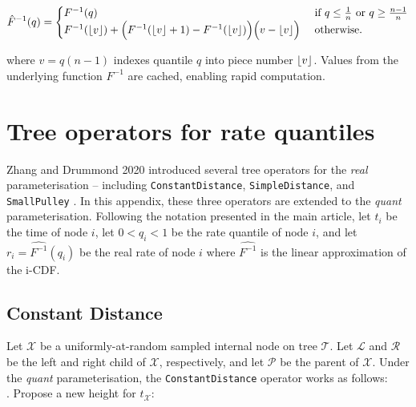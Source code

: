 \documentclass[12pt]{article}
\DeclarePairedDelimiter\floor{\lfloor}{\rfloor}
\begin{document}

\begin{align}
\hat{F}^{-1}(q) = \begin{cases} 
F^{-1}(q) &\text{ if } q \leq \frac{1}{n} \text{ or } q \geq \frac{n-1}{n} \\ 
F^{-1}(\floor{v}) + \Big(F^{-1}(\floor{v}+1) - F^{-1}(\floor{v}) \Big) \Big( v - \floor{v} \Big)  &\text{ otherwise}. 
\end{cases}
\end{align}

where $v = q(n-1)$ indexes quantile $q$ into piece number $\floor{v}$.
Values from the underlying function $F^{-1}$ are cached, enabling rapid computation.




\section{Tree operators for rate quantiles}


Zhang and Drummond 2020 introduced several tree operators for the \textit{real} parameterisation -- including \texttt{ConstantDistance}, \texttt{SimpleDistance}, and \texttt{SmallPulley} \cite{zhang2020improving}.
In this appendix, these three operators are extended to the \textit{quant} parameterisation.
Following the notation presented in the main article, let $t_i$ be the time of node $i$, let $0 < q_i < 1$ be the rate quantile of node $i$, and let $r_i = \hat{F^{-1}}(q_i)$ be the real rate of node $i$ where $\hat{F^{-1}}$ is the linear approximation of the i-CDF.








\subsection*{Constant Distance}



Let $\mathcal{X}$ be a uniformly-at-random sampled internal node on tree $\mathcal{T}$. Let $\mathcal{L}$ and $\mathcal{R}$ be the left and right child of $\mathcal{X}$, respectively, and let $\mathcal{P}$ be the parent of $\mathcal{X}$. 
Under the \textit{quant} parameterisation, the \texttt{ConstantDistance} operator works as follows: \\


. Propose a new height for $t_\mathcal{X}$:
\end{document}
